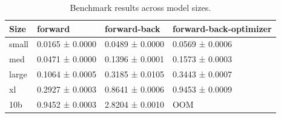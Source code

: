 \begin{table}
\caption{Benchmark results across model sizes.}
\label{tab:model-benchmark-results}
\begin{tabular}{llll}
\toprule
Size & forward & forward-back & forward-back-optimizer \\
\midrule
small & 0.0165 ± 0.0000 & 0.0489 ± 0.0000 & 0.0569 ± 0.0006 \\
med & 0.0471 ± 0.0000 & 0.1396 ± 0.0001 & 0.1573 ± 0.0003 \\
large & 0.1064 ± 0.0005 & 0.3185 ± 0.0105 & 0.3443 ± 0.0007 \\
xl & 0.2927 ± 0.0003 & 0.8641 ± 0.0006 & 0.9453 ± 0.0009 \\
10b & 0.9452 ± 0.0003 & 2.8204 ± 0.0010 & OOM \\
\bottomrule
\end{tabular}
\end{table}

